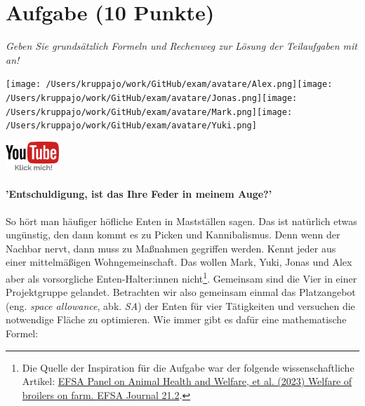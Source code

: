 \documentclass[a4paper, 9pt]{scrartcl}\usepackage[]{graphicx}\usepackage[]{xcolor}
\begin{document}

\clearpage

\section{Aufgabe \hfill (10 Punkte)}

\textit{Geben Sie grundsätzlich Formeln und Rechenweg zur Lösung der Teilaufgaben mit an!} \\[1Ex]
 

 
\begin{minipage}[t]{0.5\textwidth}
\texttt{[image: /Users/kruppajo/work/GitHub/exam/avatare/Alex.png]}\hspace{-4mm}\texttt{[image: /Users/kruppajo/work/GitHub/exam/avatare/Jonas.png]}\hspace{-4mm}\texttt{[image: /Users/kruppajo/work/GitHub/exam/avatare/Mark.png]}\hspace{-4mm}\texttt{[image: /Users/kruppajo/work/GitHub/exam/avatare/Yuki.png]}
\end{minipage}
\begin{minipage}[t]{0.5\textwidth}
\hfill
\href{https://youtu.be/n451XnhtSh4}{\includegraphics[width = 2cm]{img/youtube}}
\end{minipage}




\paragraph{'Entschuldigung, ist das Ihre Feder in meinem Auge?'}



So hört man häufiger höfliche Enten in Mastställen sagen. Das ist natürlich etwas ungünstig, den dann kommt es zu Picken und Kannibalismus. Denn wenn der Nachbar nervt, dann muss zu Maßnahmen gegriffen werden. Kennt jeder aus einer mittelmäßigen Wohngemeinschaft. Das wollen Mark, Yuki, Jonas und Alex aber als vorsorgliche Enten-Halter:innen nicht\footnote{Die Quelle der Inspiration für die Aufgabe war der folgende wissenschaftliche Artikel: \href{https://www.efsa.europa.eu/en/efsajournal/pub/7788}{EFSA Panel on Animal Health and Welfare, et al. (2023) Welfare of broilers on farm. EFSA Journal 21.2}.}. Gemeinsam sind die Vier in einer Projektgruppe gelandet. Betrachten wir also gemeinsam einmal das Platzangebot (eng. \textit{space allowance}, abk. \textit{SA}) der Enten für vier Tätigkeiten und versuchen die notwendige Fläche zu optimieren. Wie immer gibt es dafür eine mathematische Formel:
\end{document}
